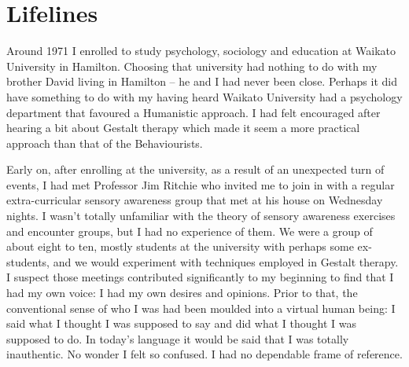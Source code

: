 \chapter{Lifelines}

Around 1971 I enrolled to study psychology, sociology and education at
Waikato University in Hamilton. Choosing that university had nothing to
do with my brother David living in Hamilton -- he and I had never been
close. Perhaps it did have something to do with my having heard Waikato
University had a psychology department that favoured a Humanistic
approach. I had felt encouraged after hearing a bit about Gestalt
therapy which made it seem a more practical approach than that of the
Behaviourists.

Early on, after enrolling at the university, as a result of an
unexpected turn of events, I had met Professor Jim Ritchie who invited
me to join in with a regular extra-curricular sensory awareness group
that met at his house on Wednesday nights. I wasn't totally unfamiliar
with the theory of sensory awareness exercises and encounter groups, but
I had no experience of them. We were a group of about eight to ten,
mostly students at the university with perhaps some ex-students, and we
would experiment with techniques employed in Gestalt therapy. I suspect
those meetings contributed significantly to my beginning to find that I
had my own voice: I had my own desires and opinions. Prior to that, the
conventional sense of who I was had been moulded into a virtual human
being: I said what I thought I was supposed to say and did what I
thought I was supposed to do. In today's language it would be said that
I was totally inauthentic. No wonder I felt so confused. I had no
dependable frame of reference.

